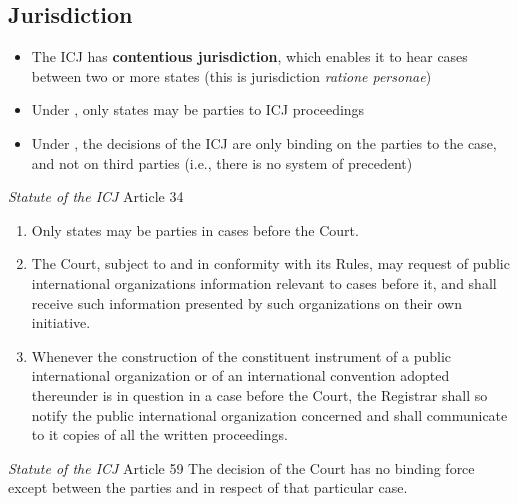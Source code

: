 \subsection{Jurisdiction}
\begin{itemize}
    \item The ICJ has \textbf{contentious jurisdiction}, which enables it to hear cases between two or more states (this is jurisdiction \textit{ratione personae})
    \item Under , only states may be parties to ICJ proceedings
    \item Under , the decisions of the ICJ are only binding on the parties to the case, and not on third parties (i.e., there is no system of precedent)
\end{itemize}

\begin{statutedetails}{\textit{Statute of the ICJ} Article 34}
    \flushleft
    \begin{enumerate}
        \item Only states may be parties in cases before the Court.
        \item The Court, subject to and in conformity with its Rules, may request of public international organizations information relevant to cases before it, and shall receive such information presented by such organizations on their own initiative.
        \item Whenever the construction of the constituent instrument of a public international organization or of an international convention adopted thereunder is in question in a case before the Court, the Registrar shall so notify the public international organization concerned and shall communicate to it copies of all the written proceedings.
    \end{enumerate}
\end{statutedetails}

\begin{statutedetails}{\textit{Statute of the ICJ} Article 59}
    \flushleft
    The decision of the Court has no binding force except between the parties and in respect of that particular case.
\end{statutedetails}

